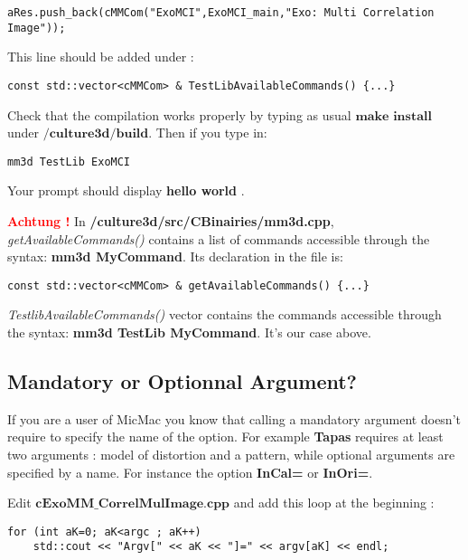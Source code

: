 \documentclass[a4paper]{book}
\begin{document}
\begin{lstlisting}
aRes.push_back(cMMCom("ExoMCI",ExoMCI_main,"Exo: Multi Correlation Image"));
\end{lstlisting}

This line should be added under : \newline
\begin{lstlisting}
const std::vector<cMMCom> & TestLibAvailableCommands() {...}
\end{lstlisting}

Check that the compilation works properly by typing as usual $\textbf{make install}$ under \og$\textbf{/culture3d/build}$\fg. Then if you type in:

\begin{lstlisting}
mm3d TestLib ExoMCI
\end{lstlisting}
Your prompt should display \og \textbf{hello world} \fg.\newline
 
 \textbf{\textcolor{red}{Achtung !}} In \textbf{/culture3d/src/CBinairies/mm3d.cpp},  \textit{getAvailableCommands()} contains a list of commands accessible through the syntax: \textbf{mm3d MyCommand}. Its declaration in the file is:
\begin{lstlisting}
const std::vector<cMMCom> & getAvailableCommands() {...}
\end{lstlisting}

\textit{TestlibAvailableCommands()} vector contains the commands accessible through the syntax: \textbf{mm3d TestLib MyCommand}. It's our case above.

\subsection{Mandatory or Optionnal Argument?}
If you are a user of MicMac you know that calling a mandatory argument doesn't require to specify the name of the option. For example \textbf{Tapas} requires at least two arguments : model of distortion and a pattern, while optional arguments are specified by a name. For instance the option \textbf{InCal=} or \textbf{InOri=}.\newline


Edit $\textbf{cExoMM\_CorrelMulImage.cpp}$ and add this loop at the beginning :\newline

\begin{lstlisting}
for (int aK=0; aK<argc ; aK++)
	std::cout << "Argv[" << aK << "]=" << argv[aK] << endl; 
\end{lstlisting}
\end{document}
